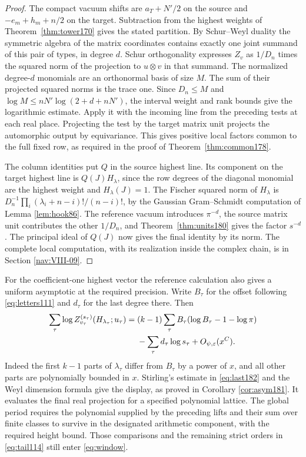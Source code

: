 \documentclass[a4paper,11pt]{article}
\theoremstyle{definition}
\theoremstyle{remark}
\numberwithin{equation}{section}
\begin{document}
\begin{proof}
The compact vacuum shifts are \(a_T+N'/2\) on the source
and \(-e_m+h_m+n/2\) on the target. Subtraction from
the highest weights of Theorem~\ref{thm:tower170} gives the
stated partition. By Schur--Weyl duality the symmetric
algebra of the matrix coordinates contains exactly one
joint summand of this pair of types, in degree \(d\).
Schur orthogonality expresses \(Z_v\) as \(1/D_n\) times
the squared norm of the projection to \(u\otimes v\) in
that summand. The normalized degree-\(d\) monomials are an
orthonormal basis of size \(M\). The sum of their projected
squared norms is the trace one. Since \(D_n\le M\) and
\(\log M\le nN'\log(2+d+nN')\), the interval weight and rank
bounds give the logarithmic estimate. Apply it with the
incoming line from the preceding tests at each real place.
Projecting the test by the target matrix unit projects the
automorphic output by equivariance. This gives positive
local factors common to the full fixed row, as required
in the proof of Theorem~\ref{thm:common178}.

The column identities put \(Q\) in the source highest line.
Its component on the target highest line is
\(Q(J)H_\lambda\), since the row degrees of the diagonal
monomial are the highest weight and \(H_\lambda(J)=1\).
The Fischer squared norm of \(H_\lambda\) is
\(D_n^{-1}\prod_i(\lambda_i+n-i)!/(n-i)!\), by the Gaussian
Gram--Schmidt computation of Lemma \ref{lem:hook86}.
The reference vacuum introduces \(\pi^{-d}\), the source
matrix unit contributes the other \(1/D_n\), and
Theorem~\ref{thm:units180} gives the factor \(s^{-d}\).
The principal ideal of \(Q(J)\) now gives the final identity
by its norm. The complete local computation, with its
realization inside the complex chain, is in
Section \ref{nav:VIII-09}.
\end{proof}

For the coefficient-one highest vector the reference
calculation also gives a uniform asymptotic at the required
precision. Write \(B_\tau\) for the offset following
\eqref{eq:letters111} and \(d_\tau\) for the last degree there.
Then
\begin{align*}
  \sum_\tau \log Z_{v_\tau}^{(s_\tau)}
                 (H_{\lambda_\tau};u_\tau)
     ={}&(k-1)\sum_\tau B_\tau(\log B_\tau-1-\log\pi)\\
        &-\sum_\tau d_\tau\log s_\tau+O_{\psi,\varepsilon}(x^C).
\end{align*}
Indeed the first \(k-1\) parts of \(\lambda_\tau\) differ
from \(B_\tau\) by a power of \(x\), and all other parts
are polynomially bounded in \(x\). Stirling's estimate in
\eqref{eq:last182} and the Weyl dimension formula give the
display, as proved in Corollary \ref{cor:asym181}. It evaluates
the final real projection for a specified polynomial lattice.
The global period requires the polynomial supplied by the
preceding lifts and their sum over finite classes to survive
in the designated arithmetic component, with the required
height bound. Those comparisons and the remaining strict
orders in \eqref{eq:tail114} still enter \eqref{eq:window}.
\end{document}
